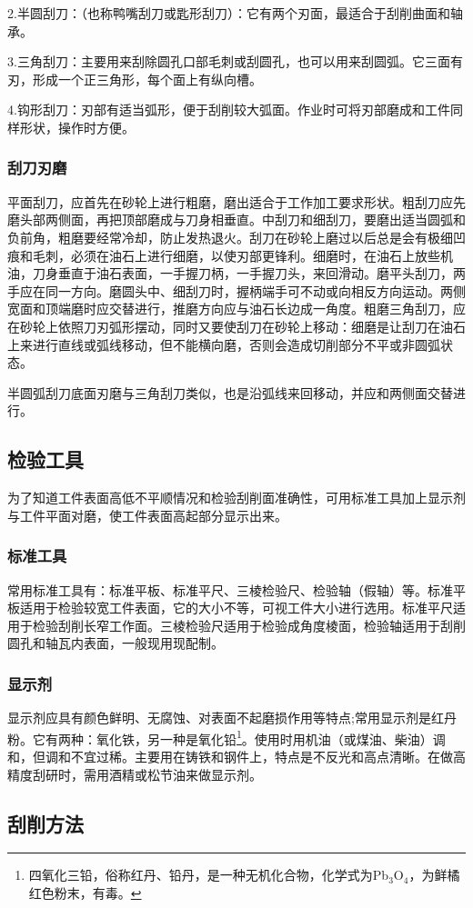 \documentclass{ctexbook}
\begin{document}
2.半圆刮刀：（也称鸭嘴刮刀或匙形刮刀）：它有两个刃面，最适合于刮削曲面和轴承。

3.三角刮刀：主要用来刮除圆孔口部毛刺或刮圆孔，也可以用来刮圆弧。它三面有刃，形成一个正三角形，每个面上有纵向槽。

4.钩形刮刀：刃部有适当弧形，便于刮削较大弧面。作业时可将刃部磨成和工件同样形状，操作时方便。
\subsubsection{刮刀刃磨}
平面刮刀，应首先在砂轮上进行粗磨，磨出适合于工作加工要求形状。粗刮刀应先磨头部两侧面，再把顶部磨成与刀身相垂直。中刮刀和细刮刀，要磨出适当圆弧和负前角，粗磨要经常冷却，防止发热退火。刮刀在砂轮上磨过以后总是会有极细凹痕和毛刺，必须在油石上进行细磨，以使刃部更锋利。细磨时，在油石上放些机油，刀身垂直于油石表面，一手握刀柄，一手握刀头，来回滑动。磨平头刮刀，两手应在同一方向。磨圆头中、细刮刀时，握柄端手可不动或向相反方向运动。两侧宽面和顶端磨时应交替进行，推磨方向应与油石长边成一角度。粗磨三角刮刀，应在砂轮上依照刀刃弧形摆动，同时又要使刮刀在砂轮上移动：细磨是让刮刀在油石上来进行直线或弧线移动，但不能横向磨，否则会造成切削部分不平或非圆弧状态。

半圆弧刮刀底面刃磨与三角刮刀类似，也是沿弧线来回移动，并应和两侧面交替进行。
\subsection{检验工具}
为了知道工件表面高低不平顺情况和检验刮削面准确性，可用标准工具加上显示剂与工件平面对磨，使工件表面高起部分显示出来。
\subsubsection{标准工具}
常用标准工具有：标准平板、标准平尺、三棱检验尺、检验轴（假轴）等。标准平板适用于检验较宽工件表面，它的大小不等，可视工件大小进行选用。标准平尺适用于检验刮削长窄工作面。三棱检验尺适用于检验成角度棱面，检验轴适用于刮削圆孔和轴瓦内表面，一般现用现配制。
\subsubsection{显示剂}
显示剂应具有颜色鲜明、无腐蚀、对表面不起磨损作用等特点;常用显示剂是红丹粉。它有两种：氧化铁，另一种是氧化铅\footnote{四氧化三铅，俗称红丹、铅丹，是一种无机化合物，化学式为Pb$_3$O$_4$，为鲜橘红色粉末，有毒。}。使用时用机油（或煤油、柴油）调和，但调和不宜过稀。主要用在铸铁和钢件上，特点是不反光和高点清晰。在做高精度刮研时，需用酒精或松节油来做显示剂。
\subsection{刮削方法}
\end{document}
